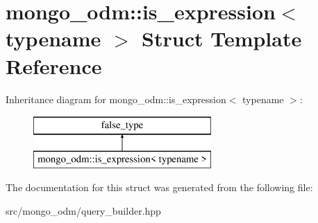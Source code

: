 \hypertarget{structmongo__odm_1_1is__expression}{}\section{mongo\+\_\+odm\+:\+:is\+\_\+expression$<$ typename $>$ Struct Template Reference}
\label{structmongo__odm_1_1is__expression}
Inheritance diagram for mongo\+\_\+odm\+:\+:is\+\_\+expression$<$ typename $>$\+:\begin{figure}[H]
\begin{center}
\leavevmode
\includegraphics[height=2.000000cm]{structmongo__odm_1_1is__expression}
\end{center}
\end{figure}


The documentation for this struct was generated from the following file\+:\begin{DoxyCompactItemize}
\item 
src/mongo\+\_\+odm/query\+\_\+builder.\+hpp\end{DoxyCompactItemize}
